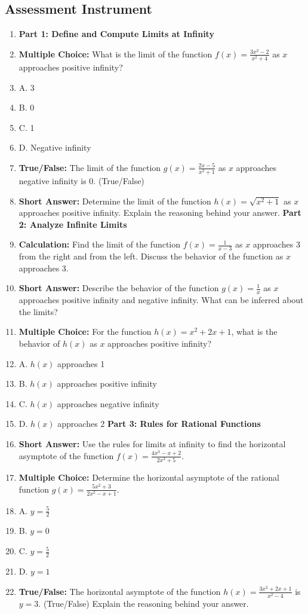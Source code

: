 \subsection{Assessment Instrument}

\begin{enumerate}
    \item \textbf{Part 1: Define and Compute Limits at Infinity}
    \item \textbf{Multiple Choice:} What is the limit of the function $f(x) = \frac{3x^2 - 2}{x^2 + 4}$ as $x$ approaches positive infinity?
    \item A. 3
    \item B. 0
    \item C. 1
    \item D. Negative infinity
    \item \textbf{True/False:} The limit of the function $g(x) = \frac{2x - 5}{x^2 + 1}$ as $x$ approaches negative infinity is 0. (True/False)
    \item \textbf{Short Answer:} Determine the limit of the function $h(x) = \sqrt{x^2 + 1}$ as $x$ approaches positive infinity. Explain the reasoning behind your answer. \textbf{Part 2: Analyze Infinite Limits}
    \item \textbf{Calculation:} Find the limit of the function $f(x) = \frac{1}{x - 3}$ as $x$ approaches 3 from the right and from the left. Discuss the behavior of the function as $x$ approaches 3.
    \item \textbf{Short Answer:} Describe the behavior of the function $g(x) = \frac{1}{x}$ as $x$ approaches positive infinity and negative infinity. What can be inferred about the limits?
    \item \textbf{Multiple Choice:} For the function $h(x) = x^2 + 2x + 1$, what is the behavior of $h(x)$ as $x$ approaches positive infinity?
    \item A. $h(x)$ approaches 1
    \item B. $h(x)$ approaches positive infinity
    \item C. $h(x)$ approaches negative infinity
    \item D. $h(x)$ approaches 2 \textbf{Part 3: Rules for Rational Functions}
    \item \textbf{Short Answer:} Use the rules for limits at infinity to find the horizontal asymptote of the function $f(x) = \frac{4x^3 - x + 2}{2x^3 + 5}$.
    \item \textbf{Multiple Choice:} Determine the horizontal asymptote of the rational function $g(x) = \frac{5x^2 + 3}{2x^2 - x + 1}$.
    \item A. $y = \frac{5}{2}$
    \item B. $y = 0$
    \item C. $y = \frac{5}{2}$
    \item D. $y = 1$
    \item \textbf{True/False:} The horizontal asymptote of the function $h(x) = \frac{3x^2 + 2x + 1}{x^2 - 4}$ is $y = 3$. (True/False) Explain the reasoning behind your answer.
\end{enumerate}

